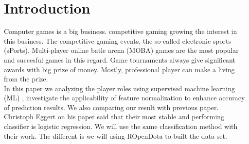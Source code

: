 \section{Introduction}

Computer games is a big business. competitive gaming growing the interest in this business. The competitive gaming events, the so-called electronic sports (sPorts). Multi-player online batle arena (MOBA) games are the most popular and succesful games in this regard. Game tournaments always give significant awards with big prize of money. Mostly, professional player can make a living from the prize. 
\\
In this paper we analyzing the player roles using supervised machine learning (ML) , investigate the applicability of feature normalization to enhance accuracy of prediction results. We also comparing our result with previous paper. Christoph Eggert on his paper said that their most stable and performing classifier is logistic regression. We will use the same classification method with their work. The different is we will using ROpenDota to built the data set.